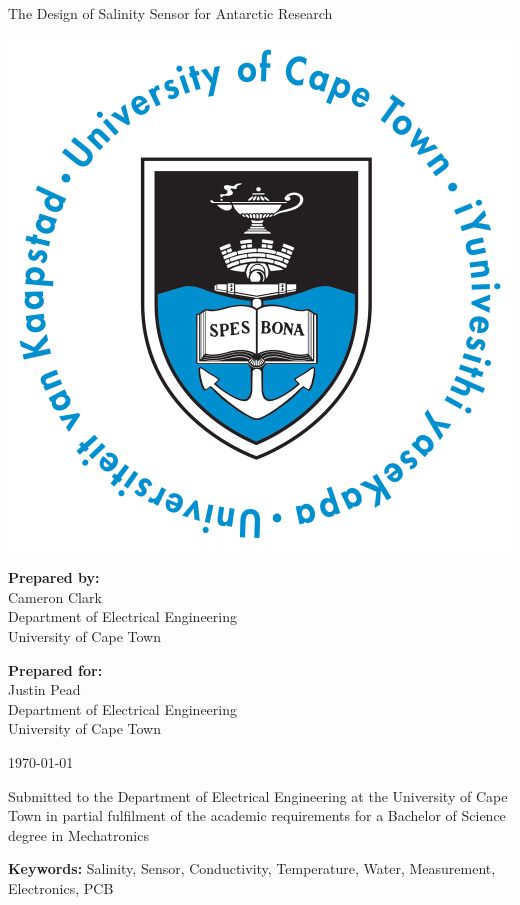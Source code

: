 \thispagestyle{empty}
\begin{center}
    
\Huge

\vspace{5cm}

The Design of Salinity Sensor for Antarctic Research

\vspace{1cm}

\includegraphics[width=0.4\linewidth]{FrontMatter/UCT_logo}

\vfill

\large
\textbf{Prepared by:}\\
Cameron Clark\\
Department of Electrical Engineering\\
University of Cape Town\\

\vspace{1cm}

\textbf{Prepared for:}\\
Justin Pead\\
Department of Electrical Engineering\\
University of Cape Town

\vspace{1cm}

\today

\vspace{1cm}

Submitted to the Department of Electrical Engineering at the University of Cape Town in partial
fulfilment of the academic requirements for a Bachelor of Science degree in Mechatronics


\vspace{1cm}
\textbf{Keywords:} Salinity, Sensor, Conductivity, Temperature, Water, Measurement, Electronics, PCB

\end{center}